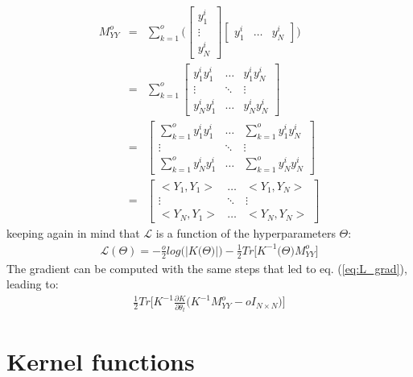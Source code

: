 \documentclass{article}
\begin{document}
\begin{eqnarray}
M^o_{YY} 
&=& \sum_{k=1}^o \bigg (
\begin{bmatrix} y^i_1 \\ \vdots \\ y^i_N \end{bmatrix}
\begin{bmatrix} y^i_1 & \hdots & y^i_N \end{bmatrix}
\bigg ) \\
&=& \sum_{k=1}^o 
\begin{bmatrix}
y^i_1 y^i_1 & \hdots & y^i_1 y^i_N \\ 
\vdots & \ddots & \vdots \\ 
y^i_N y^i_1 & \hdots & y^i_N y^i_N
\end{bmatrix} \\
&=& \begin{bmatrix}
\sum_{k=1}^o y^i_1 y^i_1 & \hdots & \sum_{k=1}^o y^i_1 y^i_N \\ 
\vdots & \ddots & \vdots \\ 
\sum_{k=1}^o y^i_N y^i_1 & \hdots & \sum_{k=1}^o y^i_N y^i_N
\end{bmatrix} \\
&=& \begin{bmatrix}
<Y_1, Y_1> & \hdots  & <Y_1, Y_N> \\ 
\vdots & \ddots & \vdots \\ 
<Y_N, Y_1> & \hdots & <Y_N, Y_N>
\end{bmatrix}
\end{eqnarray}
keeping again in mind that $\mathcal{L}$ is a function of the hyperparameters $\Theta$:
\begin{eqnarray}
\mathcal{L}(\Theta) = -\frac{o}{2} log \big (\left | K \big (\Theta \big ) \right | \big )
-\frac{1}{2} Tr \bigg [
K^{-1}\big (\Theta \big ) M^o_{YY}
\bigg ] 
\end{eqnarray}
The gradient can be computed with the same steps that led to 
eq. (\ref{eq:L_grad}), leading to:
\begin{eqnarray}
\frac{1}{2} Tr \bigg [ K^{-1} \frac{\partial K}{\partial \theta_t} \bigg (K^{-1} M^o_{YY} - o I_{N \times N} \bigg ) \bigg ]
\end{eqnarray}

\section{Kernel functions}
\label{sec:kernel_function}
\end{document}
